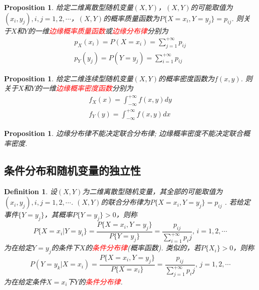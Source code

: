 \documentclass{article}
\newtheorem{proposition}[theorem]{Proposition}
\newtheorem{definition}[theorem]{Definition}
\newcommand{\redt}[1]{\textcolor{red}{#1}}
\begin{document}
\begin{proposition}
\rm 给定二维离散型随机变量$(X,Y)$，$(X,Y)$的可能取值为$(x_i,y_j), i,j =1,2,\cdots$，$(X,Y)$的概率质量函数为$P\{X = x_i,Y = y_j\}=p_{ij}$. 则关于$X$和$Y$的一维\redt{边缘概率质量函数}或\redt{边缘分布律}分别为
$$
\begin{array}{ll}
p_X(x_i) = P(X=x_i) = \sum\limits_{j=1}^{+\infty}p_{ij} \\
p_Y(y_j) = P(Y=y_j) = \sum\limits_{i=1}^{+\infty}p_{ij}  
\end{array}
$$
\end{proposition}

\begin{proposition}
\rm 给定二维连续型随机变量$(X,Y)$的概率密度函数为$f(x,y)$. 则关于$X$和$Y$的一维\redt{边缘概率密度函数}分别为
$$
\begin{array}{ll}
f_X(x) = \int_{-\infty}^{+\infty}f(x,y)dy \\
f_Y(y) = \int_{-\infty}^{+\infty}f(x,y)dx
\end{array}
$$
\end{proposition}

\begin{proposition}
\rm 边缘分布律不能决定联合分布律; 边缘概率密度不能决定联合概率密度. 
\end{proposition}

\subsection{条件分布和随机变量的独立性}

\begin{definition}
\rm 设$(X,Y)$为二维离散型随机变量，其全部的可能取值为$(x_i,y_j), i,j=1,2,\cdots$. $(X,Y)$的联合分布律为$P\{X=x_i,Y=y_j\}=p_{ij}$ . 若给定事件$\{Y=y_j\}$，其概率$P\{Y=y_j\} > 0$，则称
$$
P\{X=x_i | Y=y_i\} = \frac{P\{X=x_i,Y=y_j\}}{P\{Y=y_j\}} = \frac{p_{ij}}{\sum\limits_{i=1}^{+\infty} p_ij}, \, i=1,2,\cdots 
$$
为在给定$Y=y_j$的条件下$X$的\redt{条件分布律}(概率函数). 类似的，若$P\{X_i\}>0$，则称
$$
P(Y=y_k|X=x_i) = \frac{P\{X=x_i,Y=y_j\}}{P\{X=x_i\}} = \frac{p_{ij}}{\sum\limits_{j=1}^{+\infty} p_ij}, \, j=1,2,\cdots
$$
为在给定条件$X=x_i$下$Y$的\redt{条件分布律}. 
\end{definition}
\end{document}
